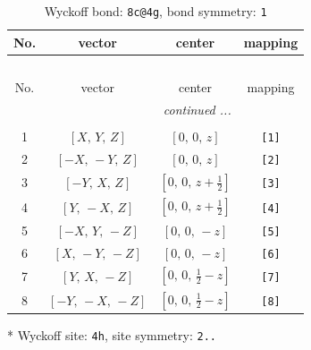 \documentclass[fleqn,8pt]{jsarticle}
\begin{document}
\renewcommand{\arraystretch}{1.2}
\begin{longtable}{cccc}
\caption{Wyckoff bond: {\tt 8c@4g}, bond symmetry: {\tt 1}}
 \\
 \hline \hline
No. & vector & center & mapping \\ \hline \endfirsthead

\multicolumn{3}{l}{\tablename\ \thetable{}} \\
 \hline \hline
No. & vector & center & mapping \\ \hline \endhead

 \hline \hline
\multicolumn{3}{r}{\footnotesize\it continued ...} \\ \endfoot

 \hline \hline
\multicolumn{3}{r}{} \\ \endlastfoot

1 & $\left[ X,\, Y,\, Z \right]$ & $\left[ 0,\, 0,\, z \right]$ & {\tt [1]} \\ \hline
2 & $\left[ - X,\, - Y,\, Z \right]$ & $\left[ 0,\, 0,\, z \right]$ & {\tt [2]} \\ \hline
3 & $\left[ - Y,\, X,\, Z \right]$ & $\left[ 0,\, 0,\, z + \frac{1}{2} \right]$ & {\tt [3]} \\ \hline
4 & $\left[ Y,\, - X,\, Z \right]$ & $\left[ 0,\, 0,\, z + \frac{1}{2} \right]$ & {\tt [4]} \\ \hline
5 & $\left[ - X,\, Y,\, - Z \right]$ & $\left[ 0,\, 0,\, - z \right]$ & {\tt [5]} \\ \hline
6 & $\left[ X,\, - Y,\, - Z \right]$ & $\left[ 0,\, 0,\, - z \right]$ & {\tt [6]} \\ \hline
7 & $\left[ Y,\, X,\, - Z \right]$ & $\left[ 0,\, 0,\, \frac{1}{2} - z \right]$ & {\tt [7]} \\ \hline
8 & $\left[ - Y,\, - X,\, - Z \right]$ & $\left[ 0,\, 0,\, \frac{1}{2} - z \right]$ & {\tt [8]} \\
\end{longtable}
* Wyckoff site: {\tt 4h}, site symmetry: {\tt 2..}
\renewcommand{\arraystretch}{1.2}
\end{document}
